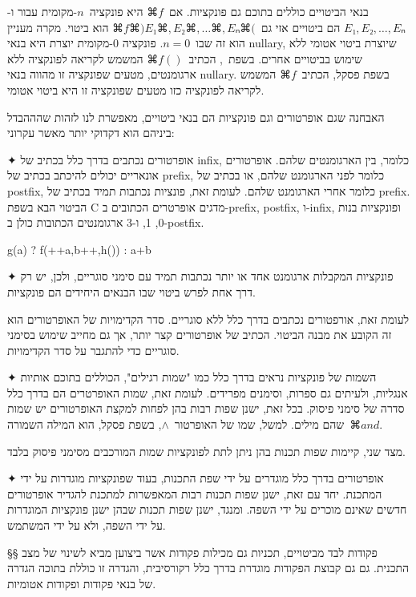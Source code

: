 בנאי הביטויים כוללים בתוכם גם פונקציות. אם~$⌘f$ היא פונקציה~$n$-מקומית
עבור ו-$E₁,E₂,…,Eₙ$ הם ביטויים אזי גם~$⌘f⌘)E₁⌘,E₂⌘,…⌘,Eₙ⌘($ הוא ביטוי.
מקרה מעניין הוא זה שבו~$n=0$. פונקציה 0-מקומית יוצרת היא בנאי nullary, שיוצרת
ביטוי אטומי ללא שימוש בביטויים אחרים.
בשפת~\CPL, הכתיב~$⌘{f()}$
המשמש לקריאה לפונקציה ללא ארגומנטים, מטעים שפונקציה זו מהווה בנאי
nullary.
בשפת פסקל, הכתיב~$⌘f$ המשמש לקריאה לפונקציה כזו מטעים שפונקציה זו היא ביטוי
אטומי.

האבחנה שגם אופרטורים וגם פונקציות הם בנאי ביטויים, מאפשרת לנו לזהות שהההבדל
ביניהם הוא דקדוקי יותר מאשר עקרוני:

✦ אופרטורים נכתבים בדרך כלל בכתיב של infix, כלומר, בין הארגומנטים שלהם.
אופרטורים אונאריים יכולים להיכתב בכתיב של prefix, כלומר לפני הארגומנט שלהם,
או בכתיב של postfix, כלומר אחרי הארגומנט שלהם. לעומת זאת, פונציות נכתבות
תמיד בכתיב של prefix.
הביטוי הבא בשפת C מדגים אופרטרים הכתובים ב-prefix, postfix, ו-infix,
ופונקציות בנות 0, 1, ו-3 ארגומנטים הכתובות כולן ב-postfix.
\begin{PASCAL}
     g(a) ? f(++a,b++,h()) : a+b
\end{PASCAL}
✦ פונקציות המקבלות ארגומנט אחד או יותר נכתבות תמיד עם סימני סוגריים, ולכן, יש
רק דרך אחת לפרש ביטוי שבו הבנאים היחידים הם פונקציות. 

לעומת זאת, אורפטורים נכתבים בדרך כלל ללא סוגריים. סדר הקדימויות של האופרטורים
הוא זה הקובע את מבנה הביטוי.  הכתיב של אופרטורים קצר יותר, אך גם מחייב
שימוש בסימני סוגריים כדי להתגבר על סדר הקדימויות.

✦ השמות של פונקציות נראים בדרך כלל כמו "שמות רגילים", הכוללים בתוכם אותיות
אנגליות, ולעיתים גם ספרות, וסימנים מפרידים. לעומת זאת, שמות האופרטרים הם בדרך
כלל סדרה של סימני פיסוק. בכל זאת, ישנן שפות רבות בהן לפחות למקצת האופרטורים יש
שמות שהם מילים. למשל, שמו של האופרטור~$∧$, בשפת פסקל, הוא המילה
השמורה~$⌘{and}$.

מצד שני, קיימות שפות תכנות בהן ניתן לתת לפונקציות שמות המורכבים מסימני פיסוק
בלבד.

✦ אופרטורים בדרך כלל מוגדרים על ידי שפת התכנות, בעוד שפונקציות מוגדרות על ידי
  המתכנת. יחד עם זאת, ישנן שפות תכנות רבות המאפשרות למתכנת להגדיר אופרטורים
  חדשים שאינם מוכרים על ידי השפה. ומנגד, ישנן שפות תכנות שבהן ישנן פונקציות
  המוגדרות על ידי השפה, ולא על ידי המשתמש.

§§ פקודות
לבד מביטויים, תכניות גם מכילות פקודות אשר ביצוען מביא לשינוי של מצב התכנית. גם
גם קבוצת הפקודות מוגדרת בדרך כלל רקורסיבית, והגדרה זו כוללת בתוכה
הגדרה של בנאי פקודות ופקודות אטומיות.

